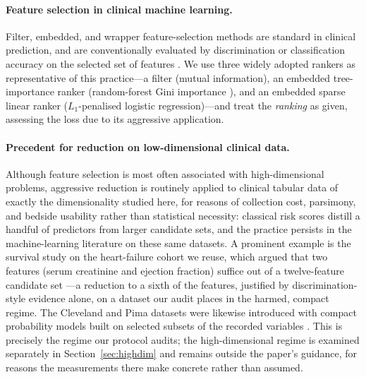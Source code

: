 \documentclass[fleqn,10pt]{wlscirep}
\begin{document}
\paragraph{Feature selection in clinical machine learning.}
Filter, embedded, and wrapper feature-selection methods are standard in clinical prediction,
and are conventionally evaluated by discrimination or classification accuracy on the selected
set of features \cite{guyon2003introduction,saeys2007review}. We use three widely adopted
rankers as representative of this practice---a filter (mutual information), an embedded
tree-importance ranker (random-forest Gini importance \cite{breiman2001random}), and an
embedded sparse linear ranker ($L_1$-penalised logistic regression)---and treat the
\emph{ranking} as given, assessing the loss due to its aggressive application.

\paragraph{Precedent for reduction on low-dimensional clinical data.}
Although feature selection is most often associated with high-dimensional problems, aggressive
reduction is routinely applied to clinical tabular data of exactly the dimensionality studied here,
for reasons of collection cost, parsimony, and bedside usability rather than statistical necessity:
classical risk scores distill a handful of predictors from larger candidate sets, and the practice
persists in the machine-learning literature on these same datasets. A prominent example is the
survival study on the heart-failure cohort we reuse, which argued that two features (serum
creatinine and ejection fraction) suffice out of a twelve-feature candidate set
\cite{chicco2020machine}---a reduction to a sixth of the features, justified by
discrimination-style evidence alone, on a dataset our audit places in the harmed, compact regime.
The Cleveland and Pima datasets were likewise introduced with compact probability models built on
selected subsets of the recorded variables \cite{detrano1989international,smith1988using}. This is
precisely the regime our protocol audits; the high-dimensional regime is examined separately in
Section~\ref{sec:highdim} and remains outside the paper's guidance, for reasons the measurements
there make concrete rather than assumed.
\end{document}
